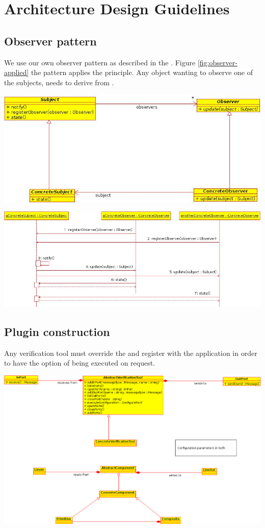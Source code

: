 \chapter{Architecture Design Guidelines}

\section{Observer pattern}

We use our own observer pattern as described in the . 
Figure \ref{fig:observer-applied} the pattern applies the principle. 
Any object wanting to observe one of the subjects, needs to 
derive from .

\begin{center}
	\includegraphics[width=.7\linewidth]{ObserverClassDiagram.jpeg}
	\label{fig:observer-pattern}
\end{center}

\begin{center}
	\includegraphics[width=.7\linewidth]{ObserverSequenceDiagram.jpeg}
	\label{fig:observer-applied}
\end{center}

\section{Plugin construction}

Any verification tool must override the  
and register with the application in order to have the option
of being executed on request. 

\begin{center}
	\includegraphics[width=.9\linewidth]{PluginClassDiagram}
	\label{fig:plugin-class-diagram}
\end{center}

